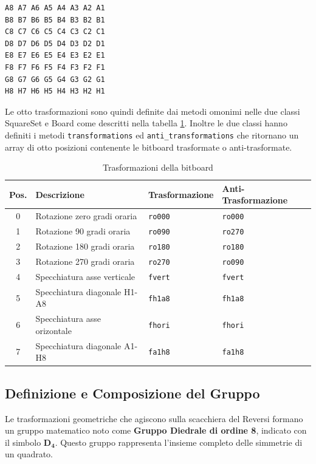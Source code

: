 {\tiny
\begin{verbatim}
A8 A7 A6 A5 A4 A3 A2 A1
B8 B7 B6 B5 B4 B3 B2 B1
C8 C7 C6 C5 C4 C3 C2 C1
D8 D7 D6 D5 D4 D3 D2 D1
E8 E7 E6 E5 E4 E3 E2 E1
F8 F7 F6 F5 F4 F3 F2 F1
G8 G7 G6 G5 G4 G3 G2 G1
H8 H7 H6 H5 H4 H3 H2 H1
\end{verbatim}
}

Le otto trasformazioni sono quindi definite dai metodi omonimi nelle due classi SquareSet e Board come
descritti nella tabella \ref{tab:bitboard_transformations}.
Inoltre le due classi hanno definiti i metodi \texttt{transformations} ed \texttt{anti\_transformations} che ritornano
un array di otto posizioni contenente le bitboard trasformate o anti-trasformate.

\begin{table}[h]
\centering
\caption{Trasformazioni della bitboard}
\label{tab:bitboard_transformations}
\begin{tabular}{|c|l|l|l|}
\hline
\textbf{Pos.} & \textbf{Descrizione} & \textbf{Trasformazione} & \textbf{Anti-Trasformazione} \\ \hline
0 & Rotazione zero gradi oraria  & \texttt{ro000} & \texttt{ro000} \\ \hline
1 & Rotazione 90 gradi oraria    & \texttt{ro090} & \texttt{ro270} \\ \hline
2 & Rotazione 180 gradi oraria   & \texttt{ro180} & \texttt{ro180} \\ \hline
3 & Rotazione 270 gradi oraria   & \texttt{ro270} & \texttt{ro090} \\ \hline
4 & Specchiatura asse verticale  & \texttt{fvert} & \texttt{fvert} \\ \hline
5 & Specchiatura diagonale H1-A8 & \texttt{fh1a8} & \texttt{fh1a8} \\ \hline
6 & Specchiatura asse orizontale & \texttt{fhori} & \texttt{fhori} \\ \hline
7 & Specchiatura diagonale A1-H8 & \texttt{fa1h8} & \texttt{fa1h8} \\ \hline
\end{tabular}
\end{table}

\subsection{Definizione e Composizione del Gruppo}
\label{sec:gruppo_diedrale}

Le trasformazioni geometriche che agiscono sulla scacchiera del Reversi formano un gruppo matematico
noto come \textbf{Gruppo Diedrale di ordine 8}, indicato con il simbolo $\bm{D_4}$.
Questo gruppo rappresenta l'insieme completo delle simmetrie di un quadrato.

